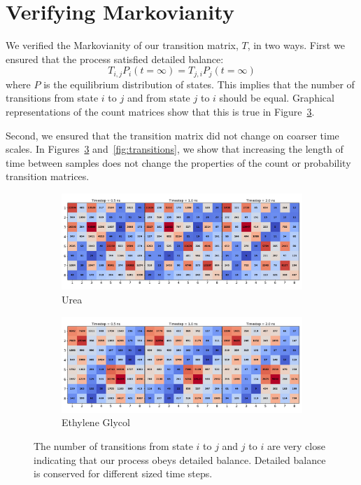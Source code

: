 \documentclass{article}
\begin{document}
  \newpage
  
  \section{Verifying Markovianity}\label{section:markov_validation}
  
  We verified the Markovianity of our transition matrix, $T$, in two ways. First we 
  ensured that the process satisfied detailed balance:
  \begin{equation}
  T_{i,j}P_i(t=\infty) = T_{j,i}P_j(t=\infty)
  \end{equation}
  where $P$ is the equilibrium distribution of states. This implies that the number
  of transitions from state $i$ to $j$ and from state $j$ to $i$ should be equal. Graphical 
  representations of the count matrices show that this is true in Figure~\ref{fig:counts}. 
  
  Second, we ensured that the transition matrix did not change on coarser time scales.
  In Figures~\ref{fig:counts} and~\ref{fig:transitions}, we show that increasing the 
  length of time between samples does not change the properties of the count or
  probability transition matrices.
  
  \begin{figure}
  \centering
  \begin{subfigure}{\textwidth}
  \includegraphics[width=\textwidth]{URE_counts.pdf}
  \caption{Urea}\label{fig:URE_counts}
  \end{subfigure}
  \begin{subfigure}{\textwidth}
  \includegraphics[width=\textwidth]{GCL_counts.pdf}
  \caption{Ethylene Glycol}\label{fig:GCL_counts}
  \end{subfigure}
  \caption{The number of transitions from state $i$ to $j$ and $j$ to $i$ are very close
  indicating that our process obeys detailed balance. Detailed balance is conserved for 
  different sized time steps.}\label{fig:counts}
  \end{figure}
  
\end{document}
